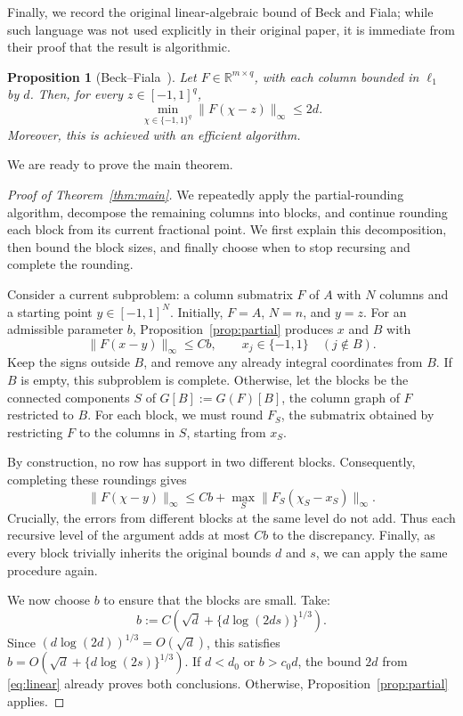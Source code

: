 \documentclass[reqno]{amsart}
\newtheorem{proposition}[theorem]{Proposition}
\theoremstyle{definition}
\newcommand{\R}{\mathbb R}
\newcommand{\norm}[1]{\lVert#1\rVert}
\begin{document}
Finally, we record the original linear-algebraic bound of Beck and Fiala; while such language was not used explicitly in their original paper, it is immediate from their proof that the result is algorithmic.

\begin{proposition}[Beck--Fiala~\cite{BF}]
Let $F\in \R^{m\times q}$, with each column bounded in $\ell_1$ by $d$. Then, for every $z\in[-1,1]^q$,
\begin{equation}\label{eq:linear} \min_{\chi\in\{-1,1\}^q} \norm{F(\chi-z)}_\infty \le 2d. \end{equation}
Moreover, this is achieved with an efficient algorithm.
\end{proposition}

We are ready to prove the main theorem.

\begin{proof}[Proof of Theorem~\ref{thm:main}]
We repeatedly apply the partial-rounding algorithm, decompose the remaining columns into blocks, and continue rounding each block from its current fractional point. We first explain this decomposition, then bound the block sizes, and finally choose when to stop recursing and complete the rounding.

Consider a current subproblem: a column submatrix $F$ of $A$ with $N$ columns and a starting point $y\in[-1,1]^N$. Initially, $F=A$, $N=n$, and $y=z$. For an admissible parameter $b$, Proposition~\ref{prop:partial} produces $x$ and $B$ with
\[ \norm{F(x-y)}_\infty\le Cb, \qquad x_j\in\{-1,1\}\quad(j\notin B). \]
Keep the signs outside $B$, and remove any already integral coordinates from $B$. If $B$ is empty, this subproblem is complete. Otherwise, let the blocks be the connected components $S$ of $G[B] := G(F)[B]$, the column graph of $F$ restricted to $B$. For each block, we must round $F_S$, the submatrix obtained by restricting $F$ to the columns in $S$, starting from $x_S$.

By construction, no row has support in two different blocks. Consequently, completing these roundings gives
\[ \norm{F(\chi-y)}_\infty \le Cb+\max_S \norm{F_{S}(\chi_S-x_S)}_\infty. \]
Crucially, the errors from different blocks at the same level do not add. Thus each recursive level of the argument adds at most $Cb$ to the discrepancy. Finally, as every block trivially inherits the original bounds $d$ and $s$, we can apply the same procedure again.

We now choose $b$ to ensure that the blocks are small. Take:
\begin{equation}\label{eq:b-choice} b:=C\left(\sqrt d+\{d\log(2ds)\}^{1/3}\right). \end{equation}
Since $(d\log(2d))^{1/3}=O(\sqrt d)$, this satisfies $b=O(\sqrt d+\{d\log(2s)\}^{1/3})$. If $d<d_0$ or $b>c_0d$, the bound $2d$ from \eqref{eq:linear} already proves both conclusions. Otherwise, Proposition~\ref{prop:partial} applies.


\end{proof}
\end{document}
